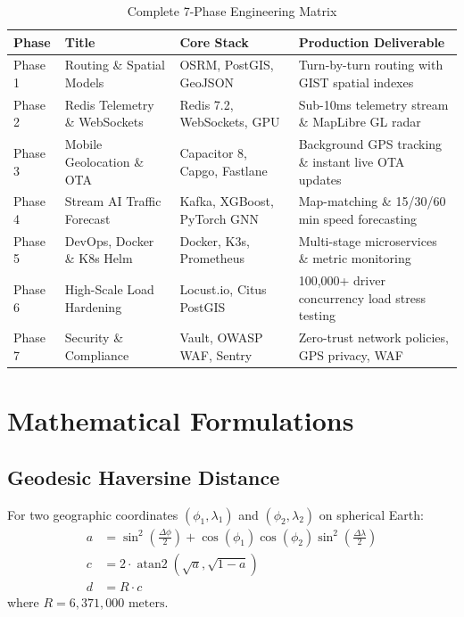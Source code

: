 \documentclass[11pt,a4paper]{article}
\begin{document}
\begin{table}[h!]
\centering
\small
\begin{tabularx}{\textwidth}{l p{4.2cm} p{3.8cm} X}
\toprule
\textbf{Phase} & \textbf{Title} & \textbf{Core Stack} & \textbf{Production Deliverable} \\
\midrule
Phase 1 & Routing \& Spatial Models & OSRM, PostGIS, GeoJSON & Turn-by-turn routing with GIST spatial indexes \\
Phase 2 & Redis Telemetry \& WebSockets & Redis 7.2, WebSockets, GPU & Sub-10ms telemetry stream \& MapLibre GL radar \\
Phase 3 & Mobile Geolocation \& OTA & Capacitor 8, Capgo, Fastlane & Background GPS tracking \& instant live OTA updates \\
Phase 4 & Stream AI Traffic Forecast & Kafka, XGBoost, PyTorch GNN & Map-matching \& 15/30/60 min speed forecasting \\
Phase 5 & DevOps, Docker \& K8s Helm & Docker, K3s, Prometheus & Multi-stage microservices \& metric monitoring \\
Phase 6 & High-Scale Load Hardening & Locust.io, Citus PostGIS & 100,000+ driver concurrency load stress testing \\
Phase 7 & Security \& Compliance & Vault, OWASP WAF, Sentry & Zero-trust network policies, GPS privacy, WAF \\
\bottomrule
\end{tabularx}
\caption{Complete 7-Phase Engineering Matrix}
\end{table}

\section{Mathematical Formulations}

\subsection{Geodesic Haversine Distance}
For two geographic coordinates $(\phi_1, \lambda_1)$ and $(\phi_2, \lambda_2)$ on spherical Earth:
\begin{align}
a &= \sin^2\left(\frac{\Delta \phi}{2}\right) + \cos(\phi_1)\cos(\phi_2)\sin^2\left(\frac{\Delta \lambda}{2}\right) \\
c &= 2 \cdot \operatorname{atan2}\left(\sqrt{a}, \sqrt{1 - a}\right) \\
d &= R \cdot c
\end{align}
where $R = 6{,}371{,}000\text{ meters}$.
\end{document}
